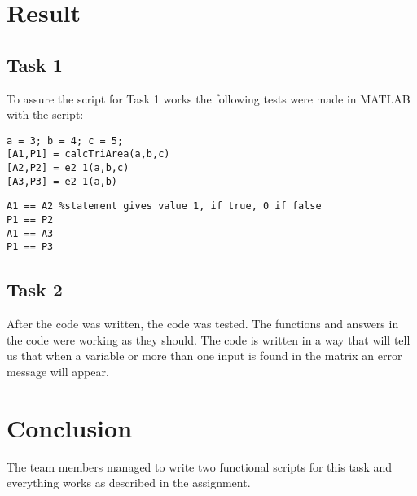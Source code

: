 \documentclass[a4paper,12pt]{article}
\begin{document}
\section{Result}
\subsection{Task 1}
To assure the script for Task 1 works the following tests were made in MATLAB with the script:


\begin{lstlisting}
a = 3; b = 4; c = 5;
[A1,P1] = calcTriArea(a,b,c)
[A2,P2] = e2_1(a,b,c)
[A3,P3] = e2_1(a,b)
\end{lstlisting}

\begin{lstlisting}
A1 == A2 %statement gives value 1, if true, 0 if false
P1 == P2
A1 == A3
P1 == P3

\end{lstlisting}

\subsection{Task 2}
After the code was written, the code was tested. The functions and answers in the code were working as they should. The code is written in a way that will tell us that when a variable or more than one input is found in the matrix an error message will appear. 



\section{Conclusion}
The team members managed to write two functional scripts for this task and everything works as described in the assignment.



\end{document}
